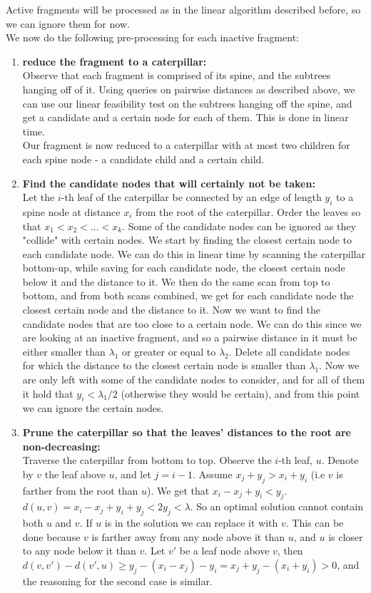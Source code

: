 \documentclass[11pt,a4paper]{article}
\theoremstyle{definition}
\theoremstyle{remark}
\begin{document}
Active fragments will be processed as in the linear algorithm described before, so we can ignore them for now.\\
We now do the following pre-processing for each inactive fragment:
\begin{enumerate}
\item\textbf{reduce the fragment to a caterpillar:}\\
Observe that each fragment is comprised of its spine, and the subtrees hanging off of it. Using queries on pairwise distances as described above, we can use our linear feasibility test on the subtrees hanging off the spine, and get a candidate and a certain node for each of them. This is done in linear time.\\
Our fragment is now reduced to a caterpillar with at most two children for each spine node - a candidate child and a certain child.
\item\label{removing certain nodes}
\textbf{Find the candidate nodes that will certainly not be taken:}\\ %
Let the $i$-th leaf of the caterpillar be connected by an edge of length $y_i$ to a spine node at distance $x_i$ from the root of the caterpillar. Order the leaves so that $x_1 < x_2 < ... < x_k$.
Some of the candidate nodes can be ignored as they "collide" with certain nodes. We start by finding the closest certain node to each candidate node. We can do this in linear time by scanning the caterpillar bottom-up, while saving for each candidate node, the closest certain node below it and the distance to it. We then do the same scan from top to bottom, and from both scans combined, we get for each candidate node the closest certain node and the distance to it. Now we want to find the candidate nodes that are too close to a certain node. We can do this since we are looking at an inactive fragment, and so a pairwise distance in it must be either smaller than $\lambda_1$ or greater or equal to $\lambda_2$. Delete all candidate nodes for which the distance to the closest certain node is smaller than $\lambda_1$. 
Now we are only left with some of the candidate nodes to consider, and for all of them it hold that $y_i < \lambda_1/2$ (otherwise they would be certain), and from this point we can ignore the certain nodes.
\item\textbf{Prune the caterpillar so that the leaves' distances to the root are non-decreasing:}\\\label{making distances from the root monotone}
Traverse the caterpillar from bottom to top. Observe the $i$-th leaf, $u$. Denote by $v$ the leaf above $u$, and let  $j=i-1$. Assume $x_j+y_j > x_i+y_i$ (i.e $v$ is farther from the root than $u$). We get that $x_i-x_j+y_i < y_j$. $d(u,v) = x_i-x_j+y_i+y_j < 2y_j < \lambda$. So an optimal solution cannot contain both $u$ and $v$. If $u$ is in the solution we can replace it with $v$. This can be done because $v$ is farther away from any node above it than $u$, and $u$ is closer to any node below it than $v$. Let $v'$ be a leaf node above $v$, then $d(v,v') - d(v',u) \geq y_j-(x_i-x_j)-y_i = x_j+y_j-(x_i+y_i) > 0$, and the reasoning for the second case is similar.

\end{enumerate}
\end{document}
